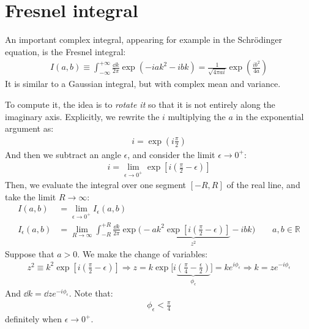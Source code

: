 \documentclass[../template.tex]{subfiles}
\begin{document}
\section{Fresnel integral}
An important complex integral, appearing for example in the Schr\"odinger equation, is the Fresnel integral:
\begin{align*}
    I(a,b) \equiv \int_{-\infty}^{+\infty} \frac{\dd{k}}{2 \pi} \exp(-ia k^2 -ib k) = \frac{1}{\sqrt{4 \pi a i}} \exp\left(\frac{i b^2}{4a} \right)
\end{align*}
It is similar to a Gaussian integral, but with complex mean and variance.

\medskip

To compute it, the idea is to \textit{rotate it} so that it is not entirely along the imaginary axis. Explicitly, we rewrite the $i$ multiplying the $a$ in the exponential argument as:
\begin{align*}
    i = \exp\left(i \frac{\pi}{2} \right)
\end{align*}
And then we subtract an angle $\epsilon$, and consider the limit $\epsilon \to 0^+$:
\begin{align*}
    i = \lim_{\epsilon \to 0^+} \exp\left[i \left(\frac{\pi}{2} - \epsilon \right)\right]
\end{align*}
Then, we evaluate the integral over one segment $[-R,R]$ of the real line, and take the limit $R \to \infty$:
\begin{align*}
    I(a, b) &= \lim_{\epsilon \to 0^+} I_\epsilon(a,b)\\
    I_{\epsilon}(a,b) &= \lim_{R \to \infty} \int_{-R}^{+R} \frac{\dd{k}}{2 \pi} \exp\Bigg(-a\underbrace{k^2 \exp\left[i\left(\frac{\pi}{2} - \epsilon \right)\right] }_{z^2}- i bk\Bigg) \qquad a,b \in \mathbb{R}
\end{align*}
Suppose that $a > 0$. We make the change of variables:
\begin{align*}
    z^2 \equiv k^2 \exp\left[i\left(\frac{\pi}{2} - \epsilon \right)\right] \Rightarrow z = k \exp\Bigg[i \underbrace{\left(\frac{\pi}{4} - \frac{\epsilon}{2}  \right)}_{\phi_\epsilon}\Bigg] = k e^{i \phi_\epsilon} \Rightarrow k = z e^{-i \phi_\epsilon}
\end{align*}
And $\dd{k} = \dd{z} e^{-i \phi_\epsilon}$. Note that:
\begin{align}
    \phi_\epsilon < \frac{\pi}{4} 
    \label{eqn:phie}
\end{align}
definitely when $\epsilon \to 0^+$.
\end{document}

